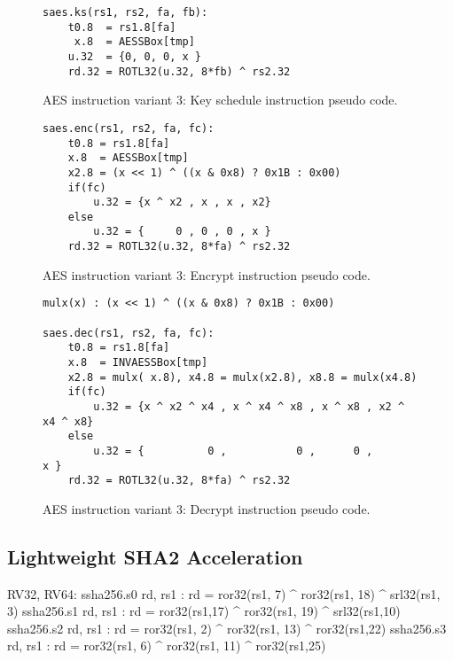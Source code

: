 \begin{figure}
\begin{lstlisting}
saes.ks(rs1, rs2, fa, fb):
    t0.8  = rs1.8[fa]
     x.8  = AESSBox[tmp]
    u.32  = {0, 0, 0, x }
    rd.32 = ROTL32(u.32, 8*fb) ^ rs2.32
\end{lstlisting}
\caption{AES instruction variant 3: Key schedule instruction pseudo code.}
\label{fig:pesudo:aes:v3:ks}
\end{figure}

\begin{figure}
\begin{lstlisting}
saes.enc(rs1, rs2, fa, fc):
    t0.8 = rs1.8[fa]
    x.8  = AESSBox[tmp]
    x2.8 = (x << 1) ^ ((x & 0x8) ? 0x1B : 0x00)
    if(fc)
        u.32 = {x ^ x2 , x , x , x2}
    else
        u.32 = {     0 , 0 , 0 , x }
    rd.32 = ROTL32(u.32, 8*fa) ^ rs2.32
\end{lstlisting}
\caption{AES instruction variant 3: Encrypt instruction pseudo code.}
\label{fig:pesudo:aes:v3:enc}
\end{figure}

\begin{figure}
\begin{lstlisting}
mulx(x) : (x << 1) ^ ((x & 0x8) ? 0x1B : 0x00)

saes.dec(rs1, rs2, fa, fc):
    t0.8 = rs1.8[fa]
    x.8  = INVAESSBox[tmp]
    x2.8 = mulx( x.8), x4.8 = mulx(x2.8), x8.8 = mulx(x4.8)
    if(fc)
        u.32 = {x ^ x2 ^ x4 , x ^ x4 ^ x8 , x ^ x8 , x2 ^ x4 ^ x8}
    else
        u.32 = {          0 ,           0 ,      0 ,           x }
    rd.32 = ROTL32(u.32, 8*fa) ^ rs2.32
\end{lstlisting}
\caption{AES instruction variant 3: Decrypt instruction pseudo code.}
\label{fig:pesudo:aes:v3:dec}
\end{figure}


\subsection{Lightweight SHA2 Acceleration}

\begin{cryptoisa}
RV32, RV64:
    ssha256.s0 rd, rs1 : rd = ror32(rs1, 7) ^ ror32(rs1, 18) ^ srl32(rs1, 3)
    ssha256.s1 rd, rs1 : rd = ror32(rs1,17) ^ ror32(rs1, 19) ^ srl32(rs1,10)
    ssha256.s2 rd, rs1 : rd = ror32(rs1, 2) ^ ror32(rs1, 13) ^ ror32(rs1,22)
    ssha256.s3 rd, rs1 : rd = ror32(rs1, 6) ^ ror32(rs1, 11) ^ ror32(rs1,25)
\end{cryptoisa}

